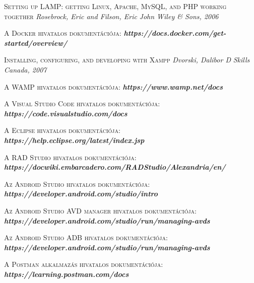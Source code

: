 \documentclass[
]{thesis-ekf}
\theoremstyle{definition}
\theoremstyle{remark}
\begin{document}
\begin{thebibliography}{2}

\textsc{Setting up LAMP: getting Linux, Apache, MySQL, and PHP working together}
\newline
\emph{Rosebrock, Eric and Filson, Eric}
\emph{John Wiley \& Sons, 2006}

\textsc{A Docker hivatalos dokumentációja:}
\newline
\emph{\bf{https://docs.docker.com/get-started/overview/}}

\textsc{Installing, configuring, and developing with Xampp}
\newline
\emph{Dvorski, Dalibor D}
\emph{Skills Canada, 2007}

\textsc{A WAMP hivatalos dokumentációja:}
\newline
\emph{\bf{https://www.wamp.net/docs}}

\textsc{A Visual Studio Code hivatalos dokumentációja:}
\newline
\emph{\bf{https://code.visualstudio.com/docs}}

\textsc{A Eclipse hivatalos dokumentációja:}
\newline
\emph{\bf{https://help.eclipse.org/latest/index.jsp}}

\textsc{A RAD Studio hivatalos dokumentációja:}
\newline
\emph{\bf{https://docwiki.embarcadero.com/RADStudio/Alexandria/en/}}

\textsc{Az Android Studio hivatalos dokumentációja:}
\newline
\emph{\bf{https://developer.android.com/studio/intro}}

\textsc{Az Android Studio AVD manager hivatalos dokumentációja:}
\newline
\emph{\bf{https://developer.android.com/studio/run/managing-avds}}

\textsc{Az Android Studio ADB hivatalos dokumentációja:}
\newline
\emph{\bf{https://developer.android.com/studio/run/managing-avds}}

\textsc{A Postman alkalmazás hivatalos dokumentációja:}
\newline
\emph{\bf{https://learning.postman.com/docs}}


\end{thebibliography}
\end{document}
